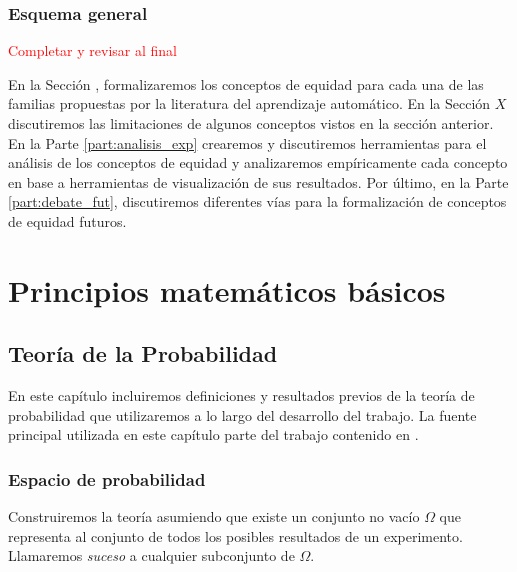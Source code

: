 \documentclass[oneside,openright,titlepage,numbers=noenddot,openany,headinclude,footinclude=true,
cleardoublepage=empty,abstractoff,BCOR=5mm,paper=a4,fontsize=12pt,main=spanish]{scrreprt}
\begin{document}
\section{Esquema general}

\textcolor{red}{Completar y revisar al final}

En la Sección , formalizaremos los conceptos de equidad para cada una de las familias propuestas por la literatura del aprendizaje automático. En la Sección $X$ discutiremos las limitaciones de algunos conceptos vistos en la sección anterior. En la Parte \ref{part:analisis_exp} crearemos y discutiremos herramientas para el análisis de los conceptos de equidad y analizaremos empíricamente cada concepto en base a herramientas de visualización de sus resultados. Por último, en la Parte \ref{part:debate_fut}, discutiremos diferentes vías para la formalización de conceptos de equidad futuros.

\part{Principios matemáticos básicos}

\chapter{Teoría de la Probabilidad}

En este capítulo incluiremos definiciones y resultados previos de la teoría de probabilidad que utilizaremos a lo largo del desarrollo del trabajo. La fuente principal utilizada en este capítulo parte del trabajo contenido en \cite{probability2014}.

\section{Espacio de probabilidad}

Construiremos la teoría asumiendo que existe un conjunto no vacío $\Omega$ que representa al conjunto de todos los posibles resultados de un experimento. Llamaremos \textit{suceso} a cualquier subconjunto de $\Omega$.\\
\end{document}
